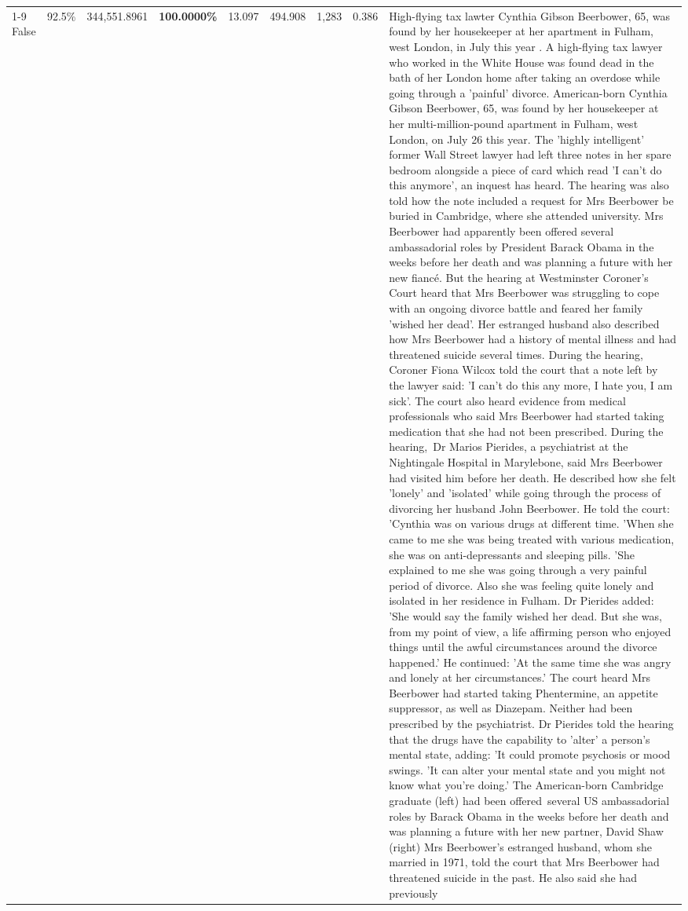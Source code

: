 \begin{table}[H]
\begin{tabular}{lllrlllll}
\cline{1-9}
False & 92.5\% & 344,551.8961 & \bfseries \color{red} 100.0000\% & 13.097 & 494.908 & 1,283 & 0.386 & High-flying tax lawter Cynthia Gibson Beerbower, 65, was found by her housekeeper at her apartment in Fulham, west London, in July this year . A high-flying tax lawyer who worked in the White House was found dead in the bath of her London home after taking an overdose while going through a 'painful' divorce. American-born Cynthia Gibson Beerbower, 65, was found by her housekeeper at her multi-million-pound apartment in Fulham, west London, on July 26 this year. The 'highly intelligent' former Wall Street lawyer had left three notes in her spare bedroom alongside a piece of card which read 'I can't do this anymore', an inquest has heard. The hearing was also told how the note included a request for Mrs Beerbower be buried in Cambridge, where she attended university. Mrs Beerbower had apparently been offered several ambassadorial roles by President Barack Obama in the weeks before her death and was planning a future with her new fiancé. But the hearing at Westminster Coroner's Court heard that Mrs Beerbower was struggling to cope with an ongoing divorce battle and feared her family 'wished her dead'. Her estranged husband also described how Mrs Beerbower had a history of mental illness and had threatened suicide several times. During the hearing, Coroner Fiona Wilcox told the court that a note left by the lawyer said: 'I can't do this any more, I hate you, I am sick'. The court also heard evidence from medical professionals who said Mrs Beerbower had started taking medication that she had not been prescribed. During the hearing, Dr Marios Pierides, a psychiatrist at the Nightingale Hospital in Marylebone, said Mrs Beerbower had visited him before her death. He described how she felt 'lonely' and 'isolated' while going through the process of divorcing her husband John Beerbower. He told the court: 'Cynthia was on various drugs at different time. 'When she came to me she was being treated with various medication, she was on anti-depressants and sleeping pills. 'She explained to me she was going through a very painful period of divorce. Also she was feeling quite lonely and isolated in her residence in Fulham. Dr Pierides added: 'She would say the family wished her dead. But she was, from my point of view, a life affirming person who enjoyed things until the awful circumstances around the divorce happened.' He continued: 'At the same time she was angry and lonely at her circumstances.' The court heard Mrs Beerbower had started taking Phentermine, an appetite suppressor, as well as Diazepam. Neither had been prescribed by the psychiatrist. Dr Pierides told the hearing that the drugs have the capability to 'alter' a person's mental state, adding: 'It could promote psychosis or mood swings. 'It can alter your mental state and you might not know what you're doing.' The American-born Cambridge graduate (left) had been offered several US ambassadorial roles by Barack Obama in the weeks before her death and was planning a future with her new partner, David Shaw (right) Mrs Beerbower's estranged husband, whom she married in 1971, told the court that Mrs Beerbower had threatened suicide in the past. He also said she had previously 
\end{tabular}
\end{table}
